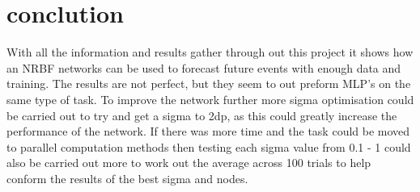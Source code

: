 \documentclass{IEEEtran}[11pt]
\begin{document}
\section{conclution}
\begin{flushleft}
  With all the information and results gather through out this project it shows
  how an NRBF networks can be used to forecast future events with enough data and
  training. The results are not perfect, but they seem to out preform MLP's on the
  same type of task. To improve the network further more sigma optimisation
  could be carried out to try and get a sigma to 2dp, as this could greatly increase
  the performance of the network. If there was more time and the task could be
  moved to parallel computation methods then testing each sigma value from 0.1
  - 1 could also be carried out more to work out the average across 100 trials to
  help conform the results of the best sigma and nodes.
  \\
  \vspace{1.5mm}
\end{flushleft}
\end{document}

